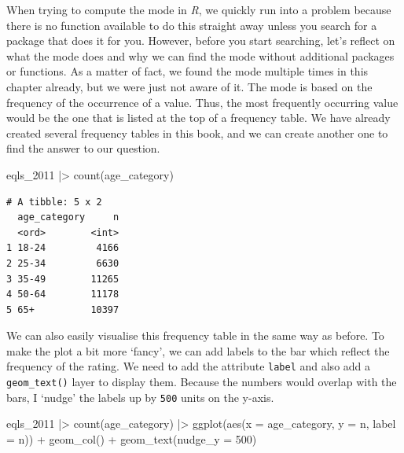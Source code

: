 \documentclass[
  letterpaper,
]{krantz}
\makeatletter
\newenvironment{Shaded}{\begin{snugshade}}{\end{snugshade}}
\newcommand{\AttributeTok}[1]{\textcolor[rgb]{0.40,0.45,0.13}{#1}}
\newcommand{\DecValTok}[1]{\textcolor[rgb]{0.68,0.00,0.00}{#1}}
\newcommand{\FunctionTok}[1]{\textcolor[rgb]{0.28,0.35,0.67}{#1}}
\newcommand{\NormalTok}[1]{\textcolor[rgb]{0.00,0.23,0.31}{#1}}
\newcommand{\SpecialCharTok}[1]{\textcolor[rgb]{0.37,0.37,0.37}{#1}}
\newenvironment{kframe}{%
\medskip{}
\setlength{\fboxsep}{.8em}
 \def\at@end@of@kframe{}%
 \ifinner\ifhmode%
  \def\at@end@of@kframe{\end{minipage}}%
  \begin{minipage}{\columnwidth}%
 \fi\fi%
 \def\FrameCommand##1{\hskip\@totalleftmargin \hskip-\fboxsep
 \colorbox{shadecolor}{##1}\hskip-\fboxsep
     \hskip-\linewidth \hskip-\@totalleftmargin \hskip\columnwidth}%
 \MakeFramed {\advance\hsize-\width
   \@totalleftmargin\z@ \linewidth\hsize
   \@setminipage}}%
 {\par\unskip\endMakeFramed%
 \at@end@of@kframe}
\renewenvironment{Shaded}{\begin{kframe}}{\end{kframe}}
\makeatother
\begin{document}
When trying to compute the mode in \emph{R}, we quickly run into a
problem because there is no function available to do this straight away
unless you search for a package that does it for you. However, before
you start searching, let's reflect on what the mode does and why we can
find the mode without additional packages or functions. As a matter of
fact, we found the mode multiple times in this chapter already, but we
were just not aware of it. The mode is based on the frequency of the
occurrence of a value. Thus, the most frequently occurring value would
be the one that is listed at the top of a frequency table. We have
already created several frequency tables in this book, and we can create
another one to find the answer to our question.

\begin{Shaded}
\begin{Highlighting}[]
\NormalTok{eqls\_2011 }\SpecialCharTok{|\textgreater{}} \FunctionTok{count}\NormalTok{(age\_category)}
\end{Highlighting}
\end{Shaded}

\begin{verbatim}
# A tibble: 5 x 2
  age_category     n
  <ord>        <int>
1 18-24         4166
2 25-34         6630
3 35-49        11265
4 50-64        11178
5 65+          10397
\end{verbatim}

We can also easily visualise this frequency table in the same way as
before. To make the plot a bit more `fancy', we can add labels to the
bar which reflect the frequency of the rating. We need to add the
attribute \texttt{label} and also add a \texttt{geom\_text()} layer to
display them. Because the numbers would overlap with the bars, I `nudge'
the labels up by \texttt{500} units on the y-axis.

\begin{Shaded}
\begin{Highlighting}[]
\NormalTok{eqls\_2011 }\SpecialCharTok{|\textgreater{}}
  \FunctionTok{count}\NormalTok{(age\_category) }\SpecialCharTok{|\textgreater{}}
  \FunctionTok{ggplot}\NormalTok{(}\FunctionTok{aes}\NormalTok{(}\AttributeTok{x =}\NormalTok{ age\_category,}
             \AttributeTok{y =}\NormalTok{ n,}
             \AttributeTok{label =}\NormalTok{ n)) }\SpecialCharTok{+}
  \FunctionTok{geom\_col}\NormalTok{() }\SpecialCharTok{+}
  \FunctionTok{geom\_text}\NormalTok{(}\AttributeTok{nudge\_y =} \DecValTok{500}\NormalTok{)}
\end{Highlighting}
\end{Shaded}
\end{document}

